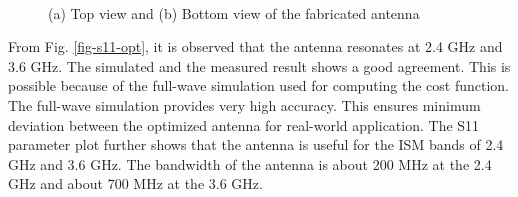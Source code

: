\begin{figure}
\centering
{}~~~
\\
\caption{(a) Top view and (b) Bottom view of the fabricated antenna}\label{h-shaped-fab}
\end{figure}

From Fig. \ref{fig-s11-opt}, it is observed that the antenna resonates at 2.4 GHz and 3.6 GHz. The simulated and the measured result shows a good agreement. This is possible because of the full-wave simulation used for computing the cost function. The full-wave simulation provides very high accuracy. This ensures minimum deviation between the optimized antenna for real-world application. The S11 parameter plot further shows that the antenna is useful for the ISM bands of 2.4 GHz and 3.6 GHz. The bandwidth of the antenna is about 200 MHz at the 2.4 GHz and about 700 MHz at the 3.6 GHz.


